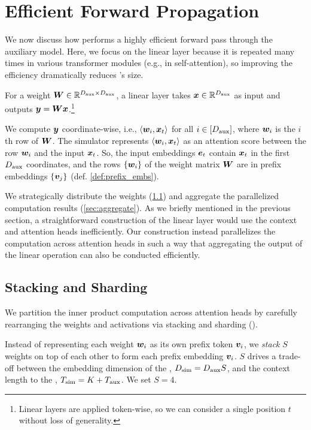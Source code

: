 \section{Efficient Forward Propagation}\label{sec:exposition_linear_forward}
We now discuss how \simulator{} performs a highly efficient forward pass through the auxiliary model.
Here, we focus on the linear layer  because it is repeated many times in various transformer modules (e.g., in self-attention), so improving the efficiency dramatically reduces \simulator{}'s size.
\begin{definition}\label{def:linear_mainpaper}
    For a weight ${\bm{W}}\in\mathbb{R}^{D_{\text{aux}} \times D_{\text{aux}}}$, a linear layer takes ${\bm{x}}\in\mathbb{R}^{D_{\text{aux}}}$ as input and outputs ${\bm{y}} = {\bm{W}}{\bm{x}}$.\footnote{Linear layers are applied token-wise, so we can consider a single position $t$ without loss of generality.}
\end{definition}
We compute ${\bm{y}}$ coordinate-wise, i.e., $\langle {\bm{w}}_i, {\bm{x}}_t\rangle$ for all $i \in [D_{\text{aux}}]$, where ${\bm{w}}_i$ is the $i$th row of ${\bm{W}}$. 
The simulator represents $\langle {\bm{w}}_i, {\bm{x}}_t\rangle$ as an attention score between the row ${\bm{w}}_i$ and the input ${\bm{x}}_t$. 
So, the input embeddings $\ve_t$ contain ${\bm{x}}_t$ in the first $D_{\text{aux}}$ coordinates, and the rows $\{{\bm{w}}_i\}$ of the weight matrix ${\bm{W}}$ are in prefix embeddings $\{{\bm{v}}_j\}$ (def. \ref{def:prefix_embs}).

We strategically distribute the weights (\textsection\ref{sec:stack}) and aggregate the parallelized computation results (\textsection\ref{sec:aggregate}).
As we briefly mentioned in the previous section, a straightforward construction of the linear layer would use the context and attention heads inefficiently.
Our construction instead parallelizes the computation across attention heads in such a way that aggregating the output of the linear operation can also be conducted efficiently.



\subsection{Stacking and Sharding}\label{sec:stack}
We partition the inner product computation across attention heads by carefully rearranging the weights and activations via stacking and sharding ().

Instead of representing each weight ${\bm{w}}_i$ as its own prefix token ${\bm{v}}_i$, we \emph{stack} $S$ weights on top of each other to form each prefix embedding ${\bm{v}}_i$. $S$ drives a trade-off between the embedding dimension of the \simulator, $D_{\text{sim}}= D_{\text{aux}}S$, and the context length to the \simulator, $T_{\text{sim}} = K+T_{\text{aux}}$. 
We set $S=4$.


